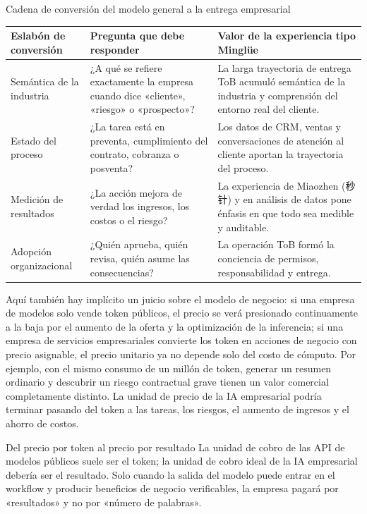 \documentclass[a4paper]{article}
\begin{document}
\begin{knowledgebox}{Cadena de conversión del modelo general a la entrega empresarial}
\begin{tabularx}{\textwidth}{p{}p{}X}
\toprule
Eslabón de conversión & Pregunta que debe responder & Valor de la experiencia tipo Minglüe \\
\midrule
Semántica de la industria & ¿A qué se refiere exactamente la empresa cuando dice «cliente», «riesgo» o «prospecto»? & La larga trayectoria de entrega ToB acumuló semántica de la industria y comprensión del entorno real del cliente. \\
Estado del proceso & ¿La tarea está en preventa, cumplimiento del contrato, cobranza o posventa? & Los datos de CRM, ventas y conversaciones de atención al cliente aportan la trayectoria del proceso. \\
Medición de resultados & ¿La acción mejora de verdad los ingresos, los costos o el riesgo? & La experiencia de Miaozhen (秒针) y en análisis de datos pone énfasis en que todo sea medible y auditable. \\
Adopción organizacional & ¿Quién aprueba, quién revisa, quién asume las consecuencias? & La operación ToB formó la conciencia de permisos, responsabilidad y entrega. \\
\bottomrule
\end{tabularx}
\end{knowledgebox}

Aquí también hay implícito un juicio sobre el modelo de negocio: si una empresa de modelos solo vende token públicos, el precio se verá presionado continuamente a la baja por el aumento de la oferta y la optimización de la inferencia; si una empresa de servicios empresariales convierte los token en acciones de negocio con precio asignable, el precio unitario ya no depende solo del costo de cómputo. Por ejemplo, con el mismo consumo de un millón de token, generar un resumen ordinario y descubrir un riesgo contractual grave tienen un valor comercial completamente distinto. La unidad de precio de la IA empresarial podría terminar pasando del token a las tareas, los riesgos, el aumento de ingresos y el ahorro de costos.

\begin{importantbox}{Del precio por token al precio por resultado}
La unidad de cobro de las API de modelos públicos suele ser el token; la unidad de cobro ideal de la IA empresarial debería ser el resultado. Solo cuando la salida del modelo puede entrar en el workflow y producir beneficios de negocio verificables, la empresa pagará por «resultados» y no por «número de palabras».
\end{importantbox}
\end{document}
